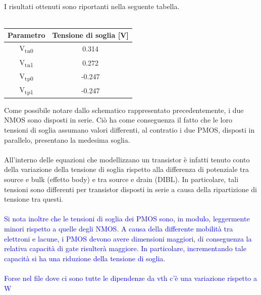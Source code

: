 \documentclass[11pt,  english, makeidx, a4paper, titlepage, oneside]{book}
\begin{document}
\\
I risultati ottenuti sono riportanti nella seguente tabella.
\\\\
\begin{center}
	\begin{tabular}{|c|c|}
	\hline
	Parametro & Tensione di soglia [V] \\
	\hline
	 V\textsubscript{tn0} & 0.314\\
	\hline
	 V\textsubscript{tn1} & 0.272 \\
	\hline
	V\textsubscript{tp0} & -0.247 \\
	\hline
	V\textsubscript{tp1} & -0.247 \\
	\hline
	\end{tabular}	
\end{center}
\vspace{0.3cm}
Come possibile notare dallo schematico rappresentato precedentemente, i due NMOS sono disposti in serie. Ciò ha come conseguenza il fatto che le loro tensioni di soglia assumano valori differenti, al contratio i due PMOS, disposti in parallelo, presentano la medesima soglia.
\\\\
All'interno delle equazioni che modellizzano un transistor è infatti tenuto conto della variazione della tensione di soglia rispetto alla differenza di potenziale tra source e bulk (effetto body) e tra source e drain (DIBL). In particolare, tali tensioni sono differenti per transistor disposti in serie a causa della ripartizione di tensione tra questi.
\\\\
\textcolor{blue}{Si nota inoltre che le tensioni di soglia dei PMOS sono, in modulo, leggermente minori rispetto a quelle degli NMOS. A causa della differente mobilità tra elettroni e lacune, i PMOS devono avere dimensioni maggiori, di conseguenza la relativa capacità di gate risulterà maggiore. In particolare, incrementando tale capacità si ha una riduzione della tensione di soglia.
\\\\
Forse nel file dove ci sono tutte le dipendenze da vth c'è una variazione rispetto a W}
\\\\
\end{document}
